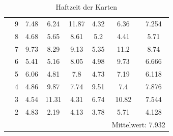 \begin{enumerate}
\begin{table}[H]
{\begin{tabular}{|c|c|c|c|c|c|c|c|}
            & 9  & 7.48         & 6.24         & 11.87        & 4.32         & 6.36                & 7.254            \\ \cline{2-8}
            & 8  & 4.68         & 5.65         & 8.61         & 5.2          & 4.41                & 5.71             \\ \cline{2-8}
            & 7  & 9.73         & 8.29         & 9.13         & 5.35         & 11.2                & 8.74             \\ \cline{2-8}
            & 6  & 5.41         & 5.16         & 8.05         & 4.98         & 9.73                & 6.666            \\ \cline{2-8}
            & 5  & 6.06         & 4.81         & 7.8          & 4.73         & 7.19                & 6.118            \\ \cline{2-8}
            & 4  & 4.86         & 9.87         & 7.74         & 9.51         & 7.4                 & 7.876            \\ \cline{2-8}
            & 3  & 4.54         & 11.31        & 4.31         & 6.74         & 10.82               & 7.544            \\ \cline{2-8}
            & 2  & 4.83         & 2.19         & 4.13         & 3.78         & 5.71                & 4.128            \\ \cline{2-8}
            &    &              &              &              &              & \multicolumn{2}{c|}{Mittelwert: 7.932} \\ \hline
        \end{tabular}}
        \caption{Haftzeit der Karten}
        \label{tab:my-table}
    \end{table}
%


\end{enumerate}
